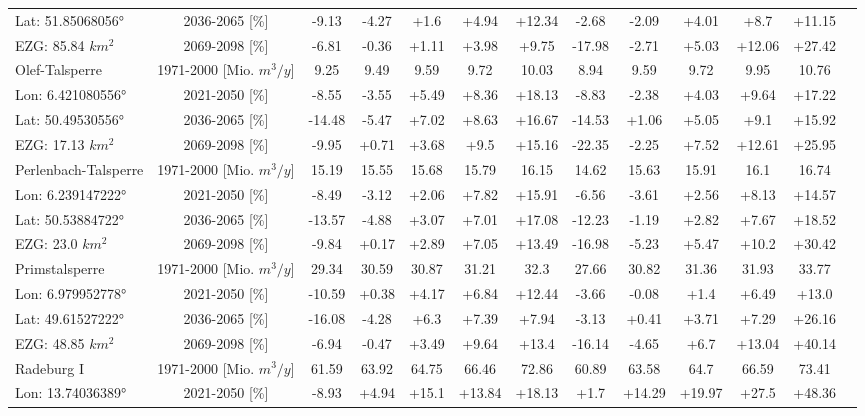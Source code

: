\begin{longtable}{@{\extracolsep{\fill}}lc|ccccc||cccccc}
Lat: 51.85068056° & 2036-2065 [\%]  & -9.13 & -4.27 & +1.6 & +4.94 & +12.34 & -2.68 & -2.09 & +4.01 & +8.7 & +11.15 & \\ 
EZG: 85.84 $km^2$ & 2069-2098 [\%]  & -6.81 & -0.36 & +1.11 & +3.98 & +9.75 & -17.98 & -2.71 & +5.03 & +12.06 & +27.42 & \\ 
\hline 
Olef-Talsperre & 1971-2000 [Mio. $m^3/y$]  & 9.25 & 9.49 & 9.59 & 9.72 & 10.03 & 8.94 & 9.59 & 9.72 & 9.95 & 10.76 & \\ 
\cline{2-13} 
Lon: 6.421080556° & 2021-2050 [\%]  & -8.55 & -3.55 & +5.49 & +8.36 & +18.13 & -8.83 & -2.38 & +4.03 & +9.64 & +17.22 & \\ 
Lat: 50.49530556° & 2036-2065 [\%]  & -14.48 & -5.47 & +7.02 & +8.63 & +16.67 & -14.53 & +1.06 & +5.05 & +9.1 & +15.92 & \\ 
EZG: 17.13 $km^2$ & 2069-2098 [\%]  & -9.95 & +0.71 & +3.68 & +9.5 & +15.16 & -22.35 & -2.25 & +7.52 & +12.61 & +25.95 & \\ 
\hline 
Perlenbach-Talsperre & 1971-2000 [Mio. $m^3/y$]  & 15.19 & 15.55 & 15.68 & 15.79 & 16.15 & 14.62 & 15.63 & 15.91 & 16.1 & 16.74 & \\ 
\cline{2-13} 
Lon: 6.239147222° & 2021-2050 [\%]  & -8.49 & -3.12 & +2.06 & +7.82 & +15.91 & -6.56 & -3.61 & +2.56 & +8.13 & +14.57 & \\ 
Lat: 50.53884722° & 2036-2065 [\%]  & -13.57 & -4.88 & +3.07 & +7.01 & +17.08 & -12.23 & -1.19 & +2.82 & +7.67 & +18.52 & \\ 
EZG: 23.0 $km^2$ & 2069-2098 [\%]  & -9.84 & +0.17 & +2.89 & +7.05 & +13.49 & -16.98 & -5.23 & +5.47 & +10.2 & +30.42 & \\ 
\hline 
Primstalsperre & 1971-2000 [Mio. $m^3/y$]  & 29.34 & 30.59 & 30.87 & 31.21 & 32.3 & 27.66 & 30.82 & 31.36 & 31.93 & 33.77 & \\ 
\cline{2-13} 
Lon: 6.979952778° & 2021-2050 [\%]  & -10.59 & +0.38 & +4.17 & +6.84 & +12.44 & -3.66 & -0.08 & +1.4 & +6.49 & +13.0 & \\ 
Lat: 49.61527222° & 2036-2065 [\%]  & -16.08 & -4.28 & +6.3 & +7.39 & +7.94 & -3.13 & +0.41 & +3.71 & +7.29 & +26.16 & \\ 
EZG: 48.85 $km^2$ & 2069-2098 [\%]  & -6.94 & -0.47 & +3.49 & +9.64 & +13.4 & -16.14 & -4.65 & +6.7 & +13.04 & +40.14 & \\ 
\hline 
Radeburg I & 1971-2000 [Mio. $m^3/y$]  & 61.59 & 63.92 & 64.75 & 66.46 & 72.86 & 60.89 & 63.58 & 64.7 & 66.59 & 73.41 & \\ 
\cline{2-13} 
Lon: 13.74036389° & 2021-2050 [\%]  & -8.93 & +4.94 & +15.1 & +13.84 & +18.13 & +1.7 & +14.29 & +19.97 & +27.5 & +48.36 & \\ 

\end{longtable}
